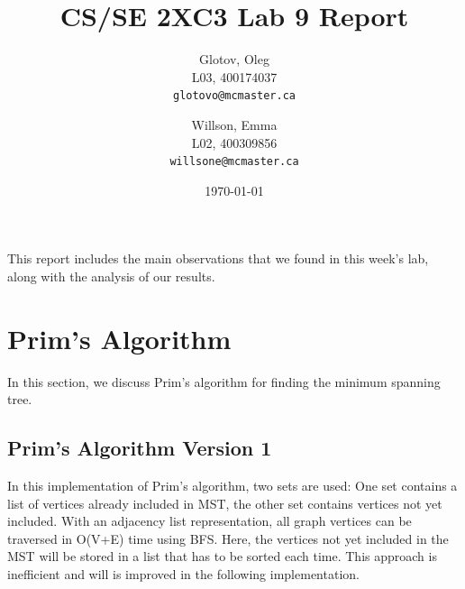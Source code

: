 \documentclass[12pt]{article}
\title{CS/SE 2XC3 Lab 9 Report}
\author{
  Glotov, Oleg\\ L03, 400174037\\
  \texttt{glotovo@mcmaster.ca}
  \and
  Willson, Emma\\ L02, 400309856\\
  \texttt{willsone@mcmaster.ca}
  }
\date{\today}
\begin{document}
\maketitle

This report includes the main observations that we found in this week's lab, along with the analysis of our results.

\newpage 
\section{Prim's Algorithm}
In this section, we discuss Prim's algorithm for finding the minimum spanning tree. 
\subsection{Prim's Algorithm Version 1}
In this implementation of Prim’s algorithm, two sets are used: One set contains a list of vertices already included in MST, the other set contains vertices not yet included. With an adjacency list representation, all graph vertices can be traversed in O(V+E) time using BFS. Here, the vertices not yet included in the MST will be stored in a list that has to be sorted each time. This approach is inefficient and will is improved in the following implementation.
\end{document}
